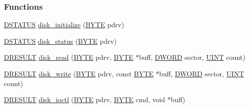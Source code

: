 \subsubsection*{Functions}
\begin{DoxyCompactItemize}
\item 
\hyperlink{diskio_8h_adba6790898ce4029c20a34b898ce73c1}{D\+S\+T\+A\+T\+U\+S} \hyperlink{diskio_8h_a09cdaa6f36fa409bdf002727bff98eb1}{disk\+\_\+initialize} (\hyperlink{integer_8h_a4ae1dab0fb4b072a66584546209e7d58}{B\+Y\+T\+E} pdrv)
\item 
\hyperlink{diskio_8h_adba6790898ce4029c20a34b898ce73c1}{D\+S\+T\+A\+T\+U\+S} \hyperlink{diskio_8h_a8348ac5ee6d709420c02e45c111f4793}{disk\+\_\+status} (\hyperlink{integer_8h_a4ae1dab0fb4b072a66584546209e7d58}{B\+Y\+T\+E} pdrv)
\item 
\hyperlink{diskio_8h_aacdfef1dad6565f65c26d12fe0ea4b2b}{D\+R\+E\+S\+U\+L\+T} \hyperlink{diskio_8h_a075d27f59f550e2cee07d00abcff32e0}{disk\+\_\+read} (\hyperlink{integer_8h_a4ae1dab0fb4b072a66584546209e7d58}{B\+Y\+T\+E} pdrv, \hyperlink{integer_8h_a4ae1dab0fb4b072a66584546209e7d58}{B\+Y\+T\+E} $\ast$buff, \hyperlink{integer_8h_ad342ac907eb044443153a22f964bf0af}{D\+W\+O\+R\+D} sector, \hyperlink{integer_8h_a36cb3b01d81ffd844bbbfb54003e06ec}{U\+I\+N\+T} count)
\item 
\hyperlink{diskio_8h_aacdfef1dad6565f65c26d12fe0ea4b2b}{D\+R\+E\+S\+U\+L\+T} \hyperlink{diskio_8h_a0fe56ee4831a44b09cfd96856e069634}{disk\+\_\+write} (\hyperlink{integer_8h_a4ae1dab0fb4b072a66584546209e7d58}{B\+Y\+T\+E} pdrv, const \hyperlink{integer_8h_a4ae1dab0fb4b072a66584546209e7d58}{B\+Y\+T\+E} $\ast$buff, \hyperlink{integer_8h_ad342ac907eb044443153a22f964bf0af}{D\+W\+O\+R\+D} sector, \hyperlink{integer_8h_a36cb3b01d81ffd844bbbfb54003e06ec}{U\+I\+N\+T} count)
\item 
\hyperlink{diskio_8h_aacdfef1dad6565f65c26d12fe0ea4b2b}{D\+R\+E\+S\+U\+L\+T} \hyperlink{diskio_8h_ab00fa450a811dbdabe3c655c1a36fab4}{disk\+\_\+ioctl} (\hyperlink{integer_8h_a4ae1dab0fb4b072a66584546209e7d58}{B\+Y\+T\+E} pdrv, \hyperlink{integer_8h_a4ae1dab0fb4b072a66584546209e7d58}{B\+Y\+T\+E} cmd, void $\ast$buff)
\item 

\end{DoxyCompactItemize}
